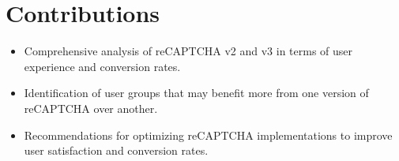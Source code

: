 \documentclass{article}
\begin{document}
\section{Contributions}
\begin{itemize}
    \item Comprehensive analysis of reCAPTCHA v2 and v3 in terms of user experience and conversion rates.
    \item Identification of user groups that may benefit more from one version of reCAPTCHA over another.
    \item Recommendations for optimizing reCAPTCHA implementations to improve user satisfaction and conversion rates.
\end{itemize}



\end{document}
